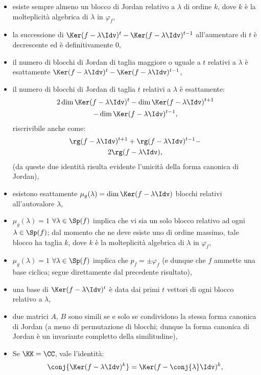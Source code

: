 \documentclass[10pt,landscape]{article}
\begin{document}
\begin{multicols}{3}
		\begin{itemize}
			\itemsep 0pt
			\item esiste sempre almeno un blocco di Jordan relativo a $\lambda$ di ordine $k$,
			dove $k$ è la molteplicità algebrica di $\lambda$ in $\varphi_f$,
			\item la successione di $\Ker (f-\lambda \Idv)^t - \Ker (f - \lambda \Idv)^{t-1}$
			all'aumentare di $t$ è decrescente ed è definitivamente $0$,
			\item il numero di blocchi di Jordan di taglia maggiore o uguale a $t$ relativi
			a $\lambda$ è esattamente $\Ker (f-\lambda \Idv)^t - \Ker (f - \lambda \Idv)^{t-1}$,
			\item il numero di blocchi di Jordan di taglia $t$ relativi a $\lambda$
			è esattamente:
			\begin{gather*}
				2 \dim \Ker (f-\lambda \Idv)^t - \dim \Ker (f-\lambda \Idv)^{t+1} \\ - \dim \Ker (f-\lambda \Idv)^{t-1},
			\end{gather*}
			riscrivibile anche come:
			\begin{gather*}
				\rg (f-\lambda \Idv)^{t+1} + \rg (f-\lambda \Idv)^{t-1} - \\
				2 \rg (f-\lambda \Idv),
			\end{gather*}
			(da queste due identità risulta evidente l'unicità della forma canonica di Jordan),
			\item esistono esattamente $\mu_g(\lambda) = \dim \Ker (f - \lambda \Idv)$ blocchi
			relativi all'autovalore $\lambda$,
			\item $\mu_g(\lambda) = 1$ $\forall \lambda \in \Sp(f)$ implica
			che vi sia un solo blocco relativo ad ogni $\lambda \in \Sp(f)$; dal
			momento che ne deve esiste uno di ordine massimo, tale blocco ha taglia
			$k$, dove $k$ è la molteplicità algebrica di $\lambda$ in $\varphi_f$,
			\item $\mu_g(\lambda) = 1$ $\forall \lambda \in \Sp(f)$ implica che
			$p_f = \pm \varphi_f$ (e dunque che $f$ ammette una base ciclica; segue
			direttamente dal precedente risultato),
			\item una base di $\Ker (f - \lambda \Idv)^t$ è data dai primi $t$ vettori
			di ogni blocco relativo a $\lambda$,
			\item due matrici $A$, $B$ sono simili se e solo se condividono la stessa
			forma canonica di Jordan (a meno di permutazione di blocchi; dunque la
			forma canonica di Jordan è un invariante completto della similitudine),
			\item Se $\KK=\CC$, vale l'identità:
			\[ \conj{\Ker (f - \lambda \Idv)^k} = \Ker (f - \conj{\lambda} \Idv)^k, \]
			

\end{itemize}
\end{multicols}
\end{document}
